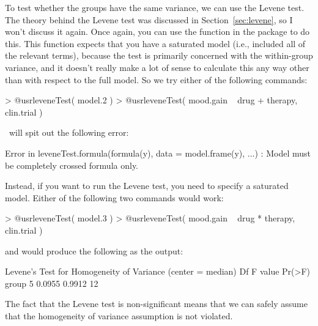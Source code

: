 To test whether the groups have the same variance, we can use the Levene test. The theory behind the Levene test was discussed in Section~\ref{sec:levene}, so I won't discuss it again. Once again, you can use the  function in the  package to do this. This function expects that you have a saturated model (i.e., included all of the relevant terms), because the test is primarily concerned with the within-group variance, and it doesn't really make a lot of sense to calculate this any way other than with respect to the full model. So we try either of the following commands:
\begin{rblock1}
> @usr{leveneTest( model.2 )}
> @usr{leveneTest( mood.gain ~ drug + therapy, clin.trial )}
\end{rblock1}
\R\ will spit out the following error:
\begin{rblock1}
Error in leveneTest.formula(formula(y), data = model.frame(y), ...) : 
  Model must be completely crossed formula only.
\end{rblock1}
Instead, if you want to run the Levene test, you need to specify a saturated model. Either of the following two commands would work:
\begin{rblock1}
> @usr{leveneTest( model.3 )}
> @usr{leveneTest( mood.gain ~ drug * therapy, clin.trial )}
\end{rblock1}
and would produce the following as the output:
\begin{rblock1}
Levene's Test for Homogeneity of Variance (center = median)
      Df F value Pr(>F)
group  5  0.0955 0.9912
      12 
\end{rblock1}
The fact that the Levene test is non-significant means that we can safely assume that the homogeneity of variance assumption is not violated.


